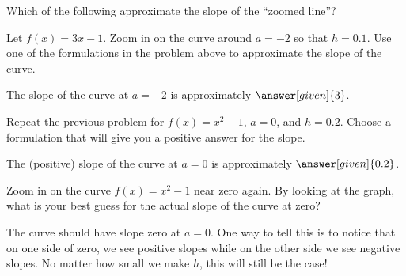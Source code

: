 \documentclass{ximera}
\begin{document}
\begin{problem}
  Which of the following approximate the slope of the ``zoomed line''?
  \begin{selectAll}
  \end{selectAll}
\end{problem}

\begin{problem}
   Let $f(x) = 3x-1$.  Zoom in on the curve around $a = -2$ so that $h = 0.1$.  Use one of the formulations in the problem above to approximate the slope of the curve.
   
   The slope of the curve at $a = -2$ is approximately $\answer[given]{3}$.
\end{problem}

\begin{problem}
   Repeat the previous problem for $f(x) = x^2 - 1$, $a = 0$, and $h = 0.2$.  Choose a formulation that will give you a positive answer for the slope.
   
   The (positive) slope of the curve at $a = 0$ is approximately $\answer[given]{0.2}$.
\end{problem}


\begin{problem}
   Zoom in on the curve $f(x) = x^2 - 1$ near zero again.  By looking at the graph, what is your best guess for the actual slope of the curve at zero?
   \begin{freeResponse}
   	The curve should have slope zero at $a = 0$.  One way to tell this is to notice that on one side of zero, we see positive slopes while on the other side we see negative slopes.  No matter how small we make $h$, this will still be the case!
   \end{freeResponse}
\end{problem}


\end{document}
